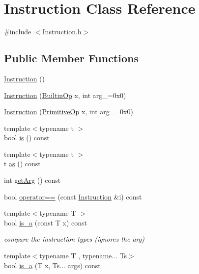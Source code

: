 \hypertarget{class_instruction}{}\section{Instruction Class Reference}
\label{class_instruction}


{\ttfamily \#include $<$Instruction.\+h$>$}

\subsection*{Public Member Functions}
\begin{DoxyCompactItemize}
\item 
\hyperlink{class_instruction_aebd15229c1651af49dcb203707e7a2d5}{Instruction} ()
\item 
\hyperlink{class_instruction_a7f672d88ba4ec174716bbac9adb8b1b0}{Instruction} (\hyperlink{_instruction_8h_af2fb7c87c5854c5733d7bb0506b06de7}{Builtin\+Op} x, int arg\+\_\+=0x0)
\item 
\hyperlink{class_instruction_a62d7782f809fa55635a6ced1e971eb3b}{Instruction} (\hyperlink{_instruction_8h_a227278394efd1e2313c727102db09ea9}{Primitive\+Op} x, int arg\+\_\+=0x0)
\item 
{\footnotesize template$<$typename t $>$ }\\bool \hyperlink{class_instruction_ade73e12471250fd191362d462e2f4970}{is} () const
\item 
{\footnotesize template$<$typename t $>$ }\\t \hyperlink{class_instruction_ac99272000afeb9015a9d40ceed8c139b}{as} () const
\item 
int \hyperlink{class_instruction_a83a2763aa1dab5281b27dd99925f683e}{get\+Arg} () const
\item 
bool \hyperlink{class_instruction_a75e0ecee9ec917bcc47488a1fbeb6a24}{operator==} (const \hyperlink{class_instruction}{Instruction} \&i) const
\item 
{\footnotesize template$<$typename T $>$ }\\bool \hyperlink{class_instruction_a924203cd9a0516d64556ecbf6a79df8a}{is\+\_\+a} (const T x) const
\begin{DoxyCompactList}\small\item\em compare the instruction types (ignores the arg) \end{DoxyCompactList}\item 
{\footnotesize template$<$typename T , typename... Ts$>$ }\\bool \hyperlink{class_instruction_ae670ee58f9acdfd60b7213f77dfca794}{is\+\_\+a} (T x, Ts... args) const
\end{DoxyCompactItemize}
